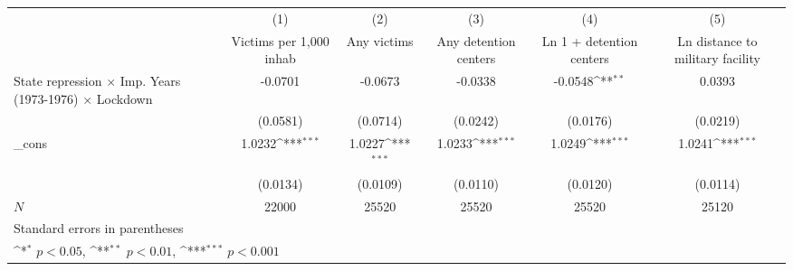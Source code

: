 {
\def\sym#1{\ifmmode^{#1}\else\(^{#1}\)\fi}
\begin{tabular}{l*{5}{c}}
\hline\hline
            &\multicolumn{1}{c}{(1)}&\multicolumn{1}{c}{(2)}&\multicolumn{1}{c}{(3)}&\multicolumn{1}{c}{(4)}&\multicolumn{1}{c}{(5)}\\
            &\multicolumn{1}{c}{Victims per 1,000 inhab}&\multicolumn{1}{c}{Any victims}&\multicolumn{1}{c}{Any detention centers}&\multicolumn{1}{c}{Ln 1 + detention centers}&\multicolumn{1}{c}{Ln distance to military facility}\\
\hline
State repression $\times$ Imp. Years (1973-1976) $\times$ Lockdown&     -0.0701         &     -0.0673         &     -0.0338         &     -0.0548\sym{**} &      0.0393         \\
            &    (0.0581)         &    (0.0714)         &    (0.0242)         &    (0.0176)         &    (0.0219)         \\
[1em]
\_cons      &      1.0232\sym{***}&      1.0227\sym{***}&      1.0233\sym{***}&      1.0249\sym{***}&      1.0241\sym{***}\\
            &    (0.0134)         &    (0.0109)         &    (0.0110)         &    (0.0120)         &    (0.0114)         \\
\hline
\(N\)       &       22000         &       25520         &       25520         &       25520         &       25120         \\
\hline\hline
\multicolumn{6}{l}{\footnotesize Standard errors in parentheses}\\
\multicolumn{6}{l}{\footnotesize \sym{*} \(p<0.05\), \sym{**} \(p<0.01\), \sym{***} \(p<0.001\)}\\
\end{tabular}
}
